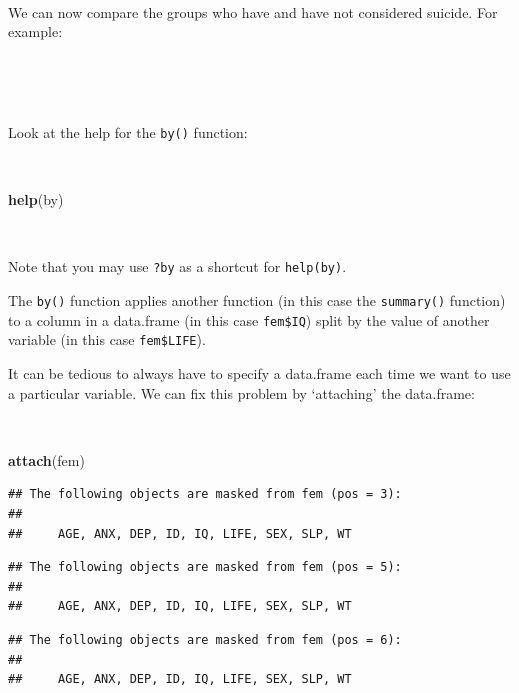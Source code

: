 \documentclass[12pt,a4paper]{book}
\newenvironment{Shaded}{\begin{snugshade}}{\end{snugshade}}
\newcommand{\KeywordTok}[1]{\textcolor[rgb]{0.13,0.29,0.53}{\textbf{#1}}}
\newcommand{\NormalTok}[1]{#1}
\newcommand{\OperatorTok}[1]{\textcolor[rgb]{0.81,0.36,0.00}{\textbf{#1}}}
\theoremstyle{definition}
\theoremstyle{definition}
\theoremstyle{definition}
\theoremstyle{remark}
\begin{document}
~

We can now compare the groups who have and have not considered suicide.
For example:

~

\begin{Shaded}
\end{Shaded}

~

Look at the help for the \texttt{by()} function:

~

\begin{Shaded}
\begin{Highlighting}[]
\KeywordTok{help}\NormalTok{(by)}
\end{Highlighting}
\end{Shaded}

~

Note that you may use \texttt{?by} as a shortcut for \texttt{help(by)}.

The \texttt{by()} function applies another function (in this case the
\texttt{summary()} function) to a column in a data.frame (in this case
\texttt{fem\$IQ}) split by the value of another variable (in this case
\texttt{fem\$LIFE}).

It can be tedious to always have to specify a data.frame each time we
want to use a particular variable. We can fix this problem by
`attaching' the data.frame:

~

\begin{Shaded}
\begin{Highlighting}[]
\KeywordTok{attach}\NormalTok{(fem)}
\end{Highlighting}
\end{Shaded}

\begin{verbatim}
## The following objects are masked from fem (pos = 3):
## 
##     AGE, ANX, DEP, ID, IQ, LIFE, SEX, SLP, WT
\end{verbatim}

\begin{verbatim}
## The following objects are masked from fem (pos = 5):
## 
##     AGE, ANX, DEP, ID, IQ, LIFE, SEX, SLP, WT
\end{verbatim}

\begin{verbatim}
## The following objects are masked from fem (pos = 6):
## 
##     AGE, ANX, DEP, ID, IQ, LIFE, SEX, SLP, WT
\end{verbatim}
\end{document}
